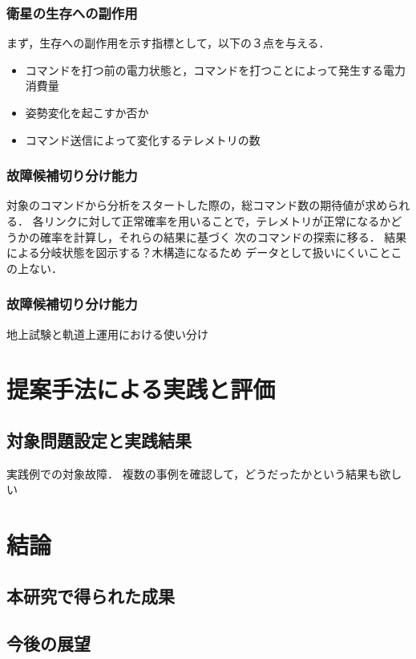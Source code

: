 \documentclass[11pt]{jsarticle}%
\begin{document}
\begin{multicols}{2}
  \subsubsection{衛星の生存への副作用}
  まず，生存への副作用を示す指標として，以下の３点を与える．
  \begin{itemize}
    \item コマンドを打つ前の電力状態と，コマンドを打つことによって発生する電力消費量
    \item 姿勢変化を起こすか否か
    \item コマンド送信によって変化するテレメトリの数
  \end{itemize}

  \subsubsection{故障候補切り分け能力}
  対象のコマンドから分析をスタートした際の，総コマンド数の期待値が求められる．
  各リンクに対して正常確率を用いることで，テレメトリが正常になるかどうかの確率を計算し，それらの結果に基づく
  次のコマンドの探索に移る．
  結果による分岐状態を図示する？木構造になるため
  データとして扱いにくいことこの上ない．

  \subsubsection{故障候補切り分け能力}

  地上試験と軌道上運用における使い分け

  \section{提案手法による実践と評価}
  \subsection{対象問題設定と実践結果}
  実践例での対象故障．
  複数の事例を確認して，どうだったかという結果も欲しい

  \subsection{}

  \section{結論}
  \subsection{本研究で得られた成果}
  
  \subsection{今後の展望}
  


  
   


\end{multicols}
\end{document}
